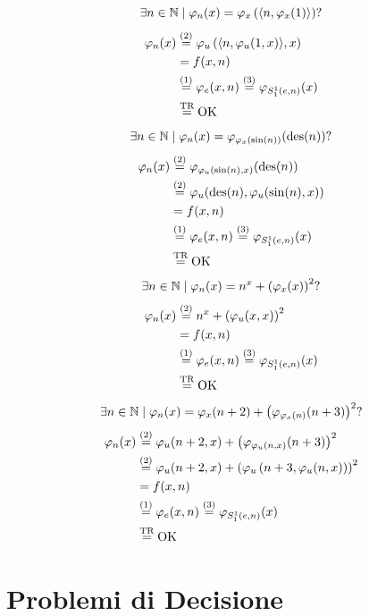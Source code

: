 $$ \exists n \in \mathbb{N} \mid \varphi_n (x) = \varphi_x \left(\langle n, \varphi_x (1) \rangle \right) ?$$
\begin{align*}
	\varphi_n (x) & \stackrel{(2)}{=} \varphi_u \left(\langle n, \varphi_u (1, x) \rangle, x\right) \\
	& = f(x,n) \\
	& \stackrel{(1)}{=} \varphi_e (x,n) \stackrel{(3)}{=} \varphi_{S_1^1 (e,n)} (x) \\
	& \stackrel{\text{TR}}{=} \text{OK} 
\end{align*}
$$ \exists n \in \mathbb{N} \mid \varphi_n (x) = \varphi_{\varphi_x (\sin (n))} (\operatorname{des} (n)) ? $$
\begin{align*}
	\varphi_n (x) & \stackrel{(2)}{=} \varphi_{\varphi_u (\sin (n), x)} (\operatorname{des} (n)) \\
	& \stackrel{(2)}{=} \varphi_u (\operatorname{des} (n), \varphi_u (\sin (n), x)) \\
	& = f(x,n) \\
	& \stackrel{(1)}{=} \varphi_e (x,n) \stackrel{(3)}{=} \varphi_{S_1^1 (e,n)} (x) \\
	& \stackrel{\text{TR}}{=} \text{OK} 
\end{align*}
$$ \exists n \in \mathbb{N} \mid \varphi_n (x) = n^x + \left(\varphi_x (x)\right)^2 ?$$
\begin{align*}
	\varphi_n (x) & \stackrel{(2)}{=} n^x + \left(\varphi_u (x,x)\right)^2 \\
	& = f(x,n) \\
	& \stackrel{(1)}{=} \varphi_e (x,n) \stackrel{(3)}{=} \varphi_{S_1^1 (e,n)} (x) \\
	& \stackrel{\text{TR}}{=} \text{OK} \\
\end{align*}
$$ \exists n \in \mathbb{N} \mid \varphi_n (x) = \varphi_x (n + 2) + \left(\varphi_{\varphi_x (n)} (n+3)\right)^2 ? $$
\begin{align*}
	\varphi_n (x) & \stackrel{(2)}{=} \varphi_u (n + 2, x) + \left(\varphi_{\varphi_u (n, x)} (n + 3)\right)^2 \\
	& \stackrel{(2)}{=} \varphi_u (n+2, x) + \left(\varphi_u \left(n + 3, \varphi_u (n,x)\right)\right)^2  \\
	& = f(x,n) \\
	& \stackrel{(1)}{=} \varphi_e (x,n) \stackrel{(3)}{=} \varphi_{S_1^1 (e,n)} (x) \\
	& \stackrel{\text{TR}}{=} \text{OK} 
\end{align*}


\section{Problemi di Decisione}


